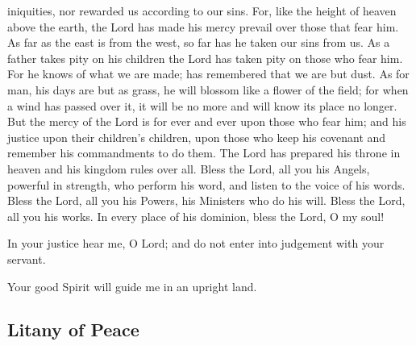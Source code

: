 \documentclass{article}
\begin{document}
\begin{service}
\begin{multicols}{2}
{  iniquities, nor rewarded us according to our sins. For, like the height of
  heaven above the earth, the Lord has made his mercy prevail over those that
  fear him. As far as the east is from the west, so far has he taken our sins from
  us. As a father takes pity on his children the Lord has taken pity on those who
  fear him. For he knows of what we are made; has remembered that we are but dust.
  As for man, his days are but as grass, he will blossom like a flower of the
  field; for when a wind has passed over it, it will be no more and will know its
  place no longer. But the mercy of the Lord is for ever and ever upon those
  who fear him; and his justice upon their children's children, upon those who
  keep his covenant and remember his commandments to do them. The Lord
  has prepared his throne in heaven and his kingdom rules over all. Bless the
  Lord, all you his Angels, powerful in strength, who perform his word, and
  listen to the voice of his words. Bless the Lord, all you his Powers, his
  Ministers who do his will. Bless the Lord, all you his works. In every place
  of his dominion, bless the Lord, O my soul!
  \item In your justice hear me, O Lord; and do not enter into judgement with
  your servant. 
  \item Your good Spirit will guide me in an upright land.
}
\rest
\entry{
  \glorybothnow
  \item \alleluia
}
\end{multicols}
\pagebreak
\subsection{Litany of Peace}
\label{matins-litany-of-peace}
\begin{multicols}{2}
\end{multicols}
\end{service}
\end{document}
